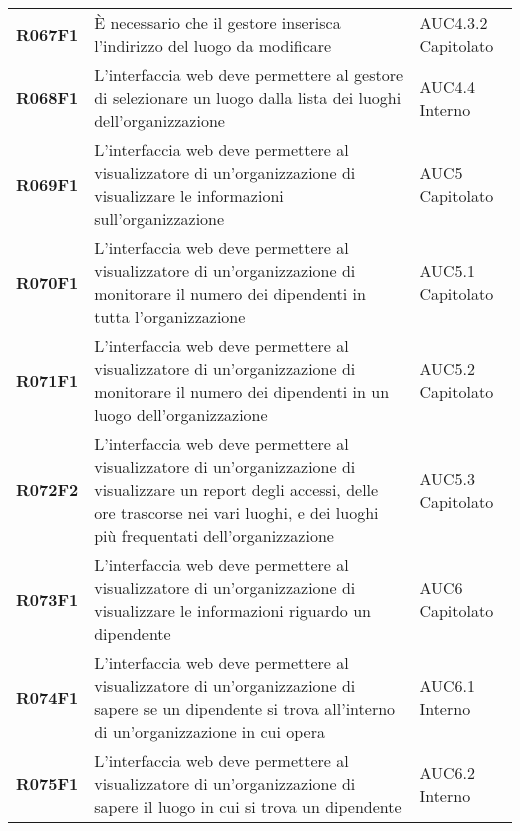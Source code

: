 \documentclass[../analisi-dei-requisiti.tex]{subfiles}
\begin{document}
\begin{center}
\begin{longtable}[H]{>{\centering\bfseries}m{3cm} >{\centering}m{10cm} >{\centering\arraybackslash}m{3cm}}
  R067F1                               & È necessario che il gestore inserisca l'indirizzo del luogo da modificare                                                                                                                               & AUC4.3.2 Capitolato           \\
  R068F1                               & L'interfaccia web deve permettere al gestore di selezionare un luogo dalla lista dei luoghi dell'organizzazione                                                                                         & AUC4.4 Interno                \\
  R069F1                               & L'interfaccia web deve permettere al visualizzatore di un'organizzazione di visualizzare le informazioni sull'organizzazione                                                                            & AUC5 Capitolato               \\
  R070F1                               & L'interfaccia web deve permettere al visualizzatore di un'organizzazione di monitorare il numero dei dipendenti in tutta l'organizzazione                                                               & AUC5.1 Capitolato             \\
  R071F1                               & L'interfaccia web deve permettere al visualizzatore di un'organizzazione di monitorare il numero dei dipendenti in un luogo dell'organizzazione                                                         & AUC5.2 Capitolato             \\
  R072F2                               & L'interfaccia web deve permettere al visualizzatore di un'organizzazione di visualizzare un report degli accessi, delle ore trascorse nei vari luoghi, e dei luoghi più frequentati dell'organizzazione & AUC5.3 Capitolato             \\
  R073F1                               & L'interfaccia web deve permettere al visualizzatore di un'organizzazione di visualizzare le informazioni riguardo un dipendente                                                                         & AUC6 Capitolato               \\
  R074F1                               & L'interfaccia web deve permettere al visualizzatore di un'organizzazione di sapere se un dipendente si trova all'interno di un'organizzazione in cui opera                                              & AUC6.1 Interno                \\
  R075F1                               & L'interfaccia web deve permettere al visualizzatore di un'organizzazione di sapere il luogo in cui si trova un dipendente                                                                               & AUC6.2 Interno                \\


\end{longtable}
\end{center}
\end{document}
